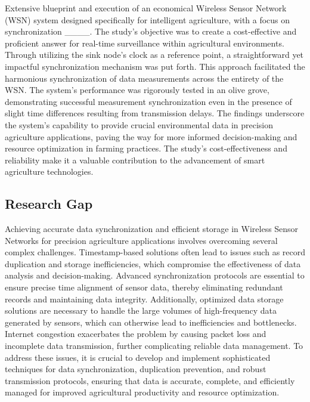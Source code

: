 Extensive blueprint and execution of an economical Wireless Sensor Network (WSN) system designed specifically for intelligent agriculture, with a focus on synchronization ____. The study's objective was to create a cost-effective and proficient answer for real-time surveillance within agricultural environments. Through utilizing the sink node's clock as a reference point, a straightforward yet impactful synchronization mechanism was put forth. This approach facilitated the harmonious synchronization of data measurements across the entirety of the WSN. The system's performance was rigorously tested in an olive grove, demonstrating successful measurement synchronization even in the presence of slight time differences resulting from transmission delays. The findings underscore the system's capability to provide crucial environmental data in precision agriculture applications, paving the way for more informed decision-making and resource optimization in farming practices. The study's cost-effectiveness and reliability make it a valuable contribution to the advancement of smart agriculture technologies.
   
\subsection*{Research Gap}
Achieving accurate data synchronization and efficient storage in 
Wireless Sensor Networks for precision agriculture applications involves overcoming several complex challenges. Timestamp-based solutions often lead to issues such as record duplication and storage inefficiencies, which compromise the effectiveness of data analysis and decision-making. Advanced synchronization protocols are essential to ensure precise time alignment of sensor data, thereby eliminating redundant records and maintaining data integrity. Additionally, optimized data storage solutions are necessary to handle the large volumes of high-frequency data generated by sensors, which can otherwise lead to inefficiencies and bottlenecks. Internet congestion exacerbates the problem by causing packet loss and incomplete data transmission, further complicating reliable data management. To address these issues, it is crucial to develop and implement sophisticated techniques for data synchronization, duplication prevention, and robust transmission protocols, ensuring that data is accurate, complete, and efficiently managed for improved agricultural productivity and resource optimization.

